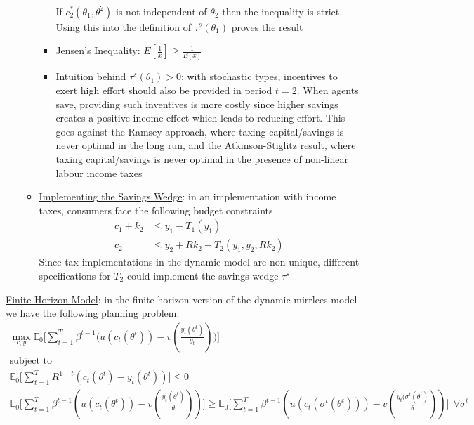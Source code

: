 \documentclass{article}
\begin{document}
\begin{itemize}
\begin{itemize}
\begin{itemize}
\begin{gather*}
             \end{gather*}
             If $c_{2}^{*}(\theta_{1}, \theta^{2})$ is not independent of $\theta_{2}$ then the inequality is strict. Using this into the definition of $\tau^{s}(\theta_{1})$ proves the result
             \item  \underline{Jensen's Inequality}: $E[\frac{1}{x}] \geq \frac{1}{E[x]}$
             \item  \underline{Intuition behind $\tau^{s}(\theta_{1}) > 0$}: with stochastic types, incentives to exert high effort should also be provided in period $t=2$. When agents save, providing such inventives is more costly since higher savings creates a positive income effect which leads to reducing effort. This goes against the Ramsey approach, where taxing capital/savings is never optimal in the long run, and the Atkinson-Stiglitz result, where taxing capital/savings is never optimal in the presence of non-linear labour income taxes
         \end{itemize}
         \item  \underline{Implementing the Savings Wedge}: in an implementation with income taxes, consumers face the following budget constraints
         \begin{align*}
             c_{1} + k_{2} &\leq y_{1} - T_{1}(y_{1}) \\
             c_{2} &\leq y_{2} + R k_{2} - T_{2}(y_{1}, y_{2}, R k_{2})
         \end{align*}
         Since tax implementations in the dynamic model are non-unique, different specifications for $T_{2}$ could implement the savings wedge $\tau^{s}$
     \end{itemize}
\end{itemize}
\vspace{2.5mm}
\par \underline{Finite Horizon Model}: in the finite horizon version of the dynamic mirrlees model we have the following planning problem:
\begin{gather*}
    \max_{c,y} \mathbb{E}_{0} \bigg[\sum_{t=1}^{T} \beta^{t-1} \big(u(c_{t}(\theta^{t})) - v(\frac{y_{t}(\theta^{t})}{\theta_{t}}) \big) \bigg] \\
    \text{subject to} \\
    \mathbb{E}_{0} \big[\sum_{t=1}^{T} R^{1-t} (c_{t}(\theta^{t}) - y_{t}(\theta^{t})) \big] \leq 0 \\
    \mathbb{E}_{0} \big[\sum_{t=1}^{T} \beta^{t-1} (u(c_{t}(\theta^{t})) - v(\frac{y_{t} (\theta^{t})}{\theta})) \big] \geq \mathbb{E}_{0} \big[\sum_{t=1}^{T} \beta^{t-1} (u(c_{t}(\sigma^{t}(\theta^{t}))) - v(\frac{y_{t} (\sigma^{t}(\theta^{t})}{\theta})) \big] \ \ \forall \sigma^{t}
\end{gather*}
\end{document}
